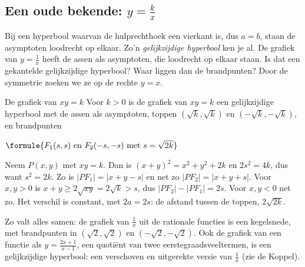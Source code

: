 \begin{oefeningen}
\end{oefeningen}

\subsection{Een oude bekende: \texorpdfstring{$y = \tfrac kx$}{y = k/x}}

Bij een hyperbool waarvan de hulprechthoek een vierkant is, dus $a = b$, staan de asymptoten loodrecht op elkaar. Zo'n \emph{gelijkzijdige hyperbool} ken je al. De grafiek van $y = \tfrac1x$ heeft de assen als asymptoten, die loodrecht op elkaar staan. Is dat een gekantelde gelijkzijdige hyperbool? Waar liggen dan de brandpunten? Door de symmetrie zoeken we ze op de rechte $y = x$.

\begin{theorie}
\begin{stelling}{De grafiek van $xy = k$}
Voor $k > 0$ is de grafiek van $xy = k$ een gelijkzijdige hyperbool met de assen als asymptoten, toppen $(\sqrt k, \sqrt k)$ en $(-\sqrt k, -\sqrt k)$, en brandpunten

\vspace{1mm}
\qquad $\formule{F_1(s, s) \text{ en } F_2(-s, -s) \text{ met } s = \sqrt{2k}}$
\end{stelling}

\begin{bewijs}
Neem $P(x, y)$ met $xy = k$. Dan is $(x + y)^2 = x^2 + y^2 + 2k$ en $2s^2 = 4k$, dus
want $s^2 = 2k$. Zo is $|PF_1| = |x + y - s|$ en net zo $|PF_2| = |x + y + s|$. Voor $x, y > 0$ is $x + y \geqslant 2\sqrt{xy} = 2\sqrt k > s$, dus $|PF_2| - |PF_1| = 2s$. Voor $x, y < 0$ net zo. Het verschil is constant, met $2a = 2s$: de afstand tussen de toppen, $2\sqrt{2k}$.
\end{bewijs}
\end{theorie}

Zo valt alles samen: de grafiek van $\tfrac1x$ uit de rationale functies is een kegelsnede, met brandpunten in $(\sqrt2, \sqrt2)$ en $(-\sqrt2, -\sqrt2)$. Ook de grafiek van een functie als $y = \tfrac{2x + 1}{x - 1}$, een quotiënt van twee eerstegraadsveeltermen, is een gelijkzijdige hyperbool: een verschoven en uitgerekte versie van $\tfrac1x$ (zie de Koppel).

